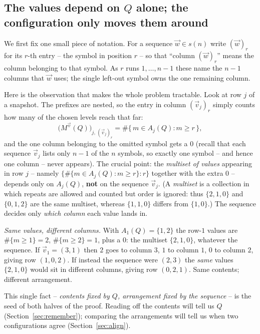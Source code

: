 \documentclass{article}
\begin{document}
\subsection*{The values depend on $Q$ alone; the configuration only moves them around}

\label{def:wr}We first fix one small piece of notation.  For a sequence $\vec w\in s(n)$ write
$(\vec w)_r$ for its $r$-th entry -- the symbol in position $r$ -- so that
``column $(\vec w)_r$'' means the column belonging to that symbol.  As $r$ runs
$1,\ldots,n-1$ these name the $n-1$ columns that $\vec w$ uses; the single left-out
symbol owns the one remaining column.

Here is the observation that makes the whole problem tractable.  Look at row $j$ of
a snapshot.  The prefixes are nested, so the entry in column $(\vec v_j)_r$ simply
counts how many of the chosen levels reach that far:
\[
\bigl(M^{\vec v}(Q)\bigr)_{j,\,(\vec v_j)_r}
=\#\{\,m\in A_j(Q): m\ge r\,\},
\]
and the one column belonging to the omitted symbol gets a $0$ (recall that each
sequence $\vec v_j$ lists only $n-1$ of the $n$ symbols, so exactly one symbol --
and hence one column -- never appears).  The crucial point:
the \emph{multiset of values} appearing in row $j$ -- namely
$\{\#\{m\in A_j(Q):m\ge r\}: r\}$ together with the extra $0$ -- depends only on
$A_j(Q)$, \textbf{not} on the sequence $\vec v_j$.  \label{def:multiset}(A \emph{multiset} is a
collection in which repeats are allowed and counted but order is ignored: thus
$\{2,1,0\}$ and $\{0,1,2\}$ are the same multiset, whereas $\{1,1,0\}$ differs from
$\{1,0\}$.)  The sequence decides only \emph{which column} each value lands in.

\medskip
\noindent\textit{Same values, different columns.}  With $A_1(Q)=\{1,2\}$ the row-$1$
values are $\#\{m\ge1\}=2$, $\#\{m\ge2\}=1$, plus a $0$: the multiset $\{2,1,0\}$,
whatever the sequence.  If $\vec v_1=(3,1)$ then $2$ goes to column $3$, $1$ to
column $1$, $0$ to column $2$, giving row $(1,0,2)$.  If instead the sequence were
$(2,3)$ the \emph{same} values $\{2,1,0\}$ would sit in different columns, giving
row $(0,2,1)$.  Same contents; different arrangement.

This single fact -- \emph{contents fixed by $Q$, arrangement fixed by the
sequence} -- is the seed of both halves of the proof.  Reading off the contents
will tell us $Q$ (Section~\ref{sec:remember}); comparing the arrangements will tell
us when two configurations agree (Section~\ref{sec:align}).
\end{document}
